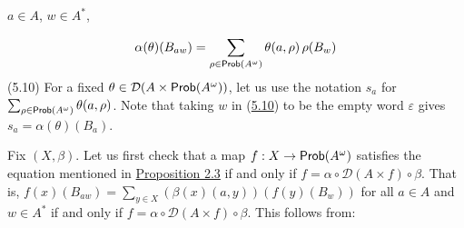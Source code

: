 \hypertarget{html:S5.SS0.SSS0.Px2.SPx1.p1.m3}{}\({a\in A}\), %
\hypertarget{html:S5.SS0.SSS0.Px2.SPx1.p1.m4}{}\({w\in A^{*}}\),
\par\medskip
\hypertarget{html:S5.E10}{}   %
\hypertarget{html:S5.E10.m1}{}\[\alpha(\theta)(B_{aw})=\sum\limits_{\rho\in\text{\sf Prob}(A^{\omega})}\theta(a,\rho)\,\rho(B_{w})\]  (5.10)   For a fixed %
\hypertarget{html:S5.SS0.SSS0.Px2.SPx1.p1.m5}{}\({\theta\in{\mathcal{D}}(A\times\text{\sf Prob}(A^{\omega}))}\), let us use the notation %
\hypertarget{html:S5.SS0.SSS0.Px2.SPx1.p1.m6}{}\({s_{a}}\) for %
\hypertarget{html:S5.SS0.SSS0.Px2.SPx1.p1.m7}{}\({\sum_{\rho\in\text{\sf Prob}(A^{\omega})}\theta(a,\rho)}\). Note that taking %
\hypertarget{html:S5.SS0.SSS0.Px2.SPx1.p1.m8}{}\({w}\) in (\hyperlink{html:S5.E10}{5.10}) to be the empty word %
\hypertarget{html:S5.SS0.SSS0.Px2.SPx1.p1.m9}{}\({\varepsilon}\) gives %
\hypertarget{html:S5.SS0.SSS0.Px2.SPx1.p1.m10}{}\({s_{a}=\alpha(\theta)(B_{a})}\).
\par\medskip
\hypertarget{html:S5.SS0.SSS0.Px2.SPx1.p2}{} Fix %
\hypertarget{html:S5.SS0.SSS0.Px2.SPx1.p2.m1}{}\({(X,\beta)}\). Let us first check that a map %
\hypertarget{html:S5.SS0.SSS0.Px2.SPx1.p2.m2}{}\({f:X\to\text{\sf Prob}(A^{\omega})}\) satisfies the equation mentioned in \hyperlink{html:S2.Thmtheorem3}{Proposition 2.3} if and only if %
\hypertarget{html:S5.SS0.SSS0.Px2.SPx1.p2.m3}{}\({f=\alpha\circ{\mathcal{D}}(A\times f)\circ\beta}\). That is, %
\hypertarget{html:S5.SS0.SSS0.Px2.SPx1.p2.m4}{}\({f(x)(B_{aw})=\sum_{y\in X}(\beta(x)(a,y))(f(y)(B_{w}))}\) for all %
\hypertarget{html:S5.SS0.SSS0.Px2.SPx1.p2.m5}{}\({a\in A}\) and %
\hypertarget{html:S5.SS0.SSS0.Px2.SPx1.p2.m6}{}\({w\in A^{*}}\) if and only if %
\hypertarget{html:S5.SS0.SSS0.Px2.SPx1.p2.m7}{}\({f=\alpha\circ{\mathcal{D}}(A\times f)\circ\beta}\). This follows from:
\par\medskip
